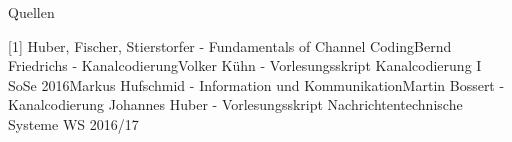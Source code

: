 \documentclass[ngerman]{beamer}
\begin{document}
\appendix
\begin{frame}[allowframebreaks]{Quellen}

[1] Huber, Fischer, Stierstorfer - Fundamentals of Channel Coding\newline
[2] Bernd Friedrichs - Kanalcodierung\newline
[3] Volker Kühn - Vorlesungsskript Kanalcodierung I SoSe 2016\newline
[4] Markus Hufschmid - Information und Kommunikation\newline
[5] Martin Bossert - Kanalcodierung \newline
[6] Johannes Huber - Vorlesungsskript Nachrichtentechnische Systeme WS 2016/17

\end{frame}
\end{document}
